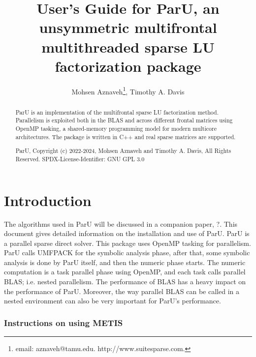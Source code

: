 \documentclass[12pt]{article}
\title{User's Guide for ParU, an unsymmetric multifrontal multithreaded sparse
LU factorization package}
\author{Mohsen Aznaveh\thanks{
email: aznaveh@tamu.edu.
http://www.suitesparse.com.
},
Timothy A. Davis}
\begin{document}
\maketitle

\begin{abstract}

ParU is an implementation of the multifrontal sparse LU factorization
method.  Parallelism is exploited both in the BLAS and across different frontal
matrices using OpenMP tasking, a shared-memory programming model for modern 
multicore architectures. The package is written in C++ and real sparse matrices 
are supported.

ParU, Copyright (c) 2022-2024, Mohsen Aznaveh and Timothy A. Davis,
All Rights Reserved.
SPDX-License-Identifier: GNU GPL 3.0
\end{abstract}

\maketitle

\section{Introduction}
\label{intro}

The algorithms used in ParU will be discussed in a companion paper,
?.
This document gives detailed information on the installation
and use of ParU.
ParU is a parallel sparse direct solver. This package uses OpenMP
tasking for parallelism. ParU calls UMFPACK for the symbolic analysis phase,
after that, some symbolic analysis is done by ParU itself, and  then the numeric
phase starts. The numeric computation is a task parallel phase using OpenMP, 
and each task calls parallel BLAS; i.e. nested parallelism. 
The performance of BLAS has a heavy impact on the performance of ParU. Moreover,
the way parallel BLAS can be called in a nested environment can also be very
important for ParU's performance.


\subsubsection{Instructions on using METIS}
\end{document}
